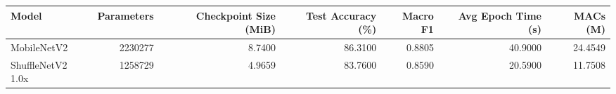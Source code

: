 \begin{tabular}{lrrrrrr}
\toprule
Model & Parameters & Checkpoint Size (MiB) & Test Accuracy (\%) & Macro F1 & Avg Epoch Time (s) & MACs (M) \\
\midrule
MobileNetV2 & 2230277 & 8.7400 & 86.3100 & 0.8805 & 40.9000 & 24.4549 \\
ShuffleNetV2 1.0x & 1258729 & 4.9659 & 83.7600 & 0.8590 & 20.5900 & 11.7508 \\
\bottomrule
\end{tabular}
